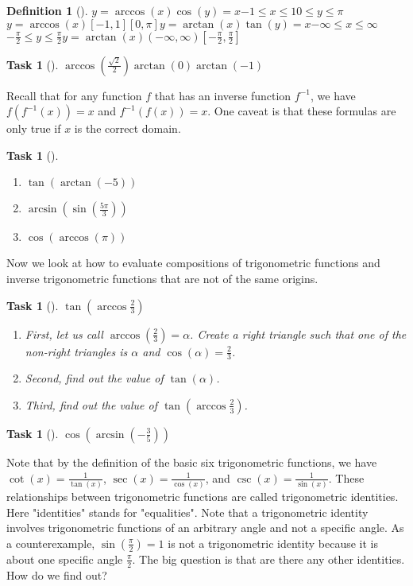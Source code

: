 \documentclass[10pt,]{article}
\theoremstyle{plain}
\newtheorem{proposition}[theorem]{Task}
\theoremstyle{definition}
\newtheorem{definition}[theorem]{Definition}
\numberwithin{equation}{section}
\begin{document}
\begin{definition}[{}]\label{definition-6}
\(y=\arccos(x)\)\(\cos(y)=x\)\(-1 \leq x \leq 1\)\(0 \leq y \leq \pi\)\(y=\arccos(x)\)\([-1,1]\)\([0,\pi]\)\(y=\arctan(x)\)\(\tan(y)=x\)\(-\infty \leq x \leq \infty\)\(-\frac{\pi}{2} \leq y \leq \frac{\pi}{2}\)\(y=\arctan(x)\)\((-\infty,\infty)\)\([-\frac{\pi}{2},\frac{\pi}{2}]\)\end{definition}
\begin{proposition}[{}]\label{proposition-68}
\(\arccos(\frac{\sqrt{2}}{2})\)\(\arctan(0)\)\(\arctan(-1)\)\end{proposition}
\hypertarget{p-132}{}%
Recall that for any function \(f\) that has an inverse function \(f^{-1}\), we have \(f(f^{-1}(x))=x\) and \(f^{-1}(f(x))=x\). One caveat is that these formulas are only true if \(x\) is the correct domain.%
\begin{proposition}[{}]\label{proposition-69}
\leavevmode%
\begin{enumerate}
\item\hypertarget{li-281}{}\(\tan(\arctan(-5))\)%
\item\hypertarget{li-282}{}\(\arcsin(\sin(\frac{5\pi}{3}))\)%
\item\hypertarget{li-283}{}\(\cos(\arccos(\pi))\)%
\end{enumerate}
\end{proposition}
\hypertarget{p-133}{}%
Now we look at how to evaluate compositions of trigonometric functions and inverse trigonometric functions that are not of the same origins.%
\begin{proposition}[{}]\label{proposition-70}
\(\tan(\arccos\frac{2}{3})\)\leavevmode%
\begin{enumerate}
\item\hypertarget{li-284}{}First, let us call \(\arccos(\frac{2}{3})=\alpha\). Create a right triangle such that one of the non-right triangles is \(\alpha\) and \(\cos(\alpha)=\frac{2}{3}\).%
\item\hypertarget{li-285}{}Second, find out the value of \(\tan(\alpha)\).%
\item\hypertarget{li-286}{}Third, find out the value of \(\tan(\arccos\frac{2}{3})\).%
\end{enumerate}
\end{proposition}
\begin{proposition}[{}]\label{proposition-71}
\(\cos(\arcsin(-\frac{3}{5}))\)\end{proposition}
\hypertarget{p-134}{}%
Note that by the definition of the basic six trigonometric functions, we have \(\cot(x) = \frac{1}{\tan(x)}\), \(\sec(x) = \frac{1}{\cos(x)}\), and \(\csc(x) = \frac{1}{\sin(x)}\). These relationships between trigonometric functions are called trigonometric identities. Here "identities" stands for "equalities". Note that a trigonometric identity involves trigonometric functions of an arbitrary angle and not a specific angle. As a counterexample, \(\sin(\frac{\pi}{2}) = 1\) is not a trigonometric identity because it is about one specific angle \(\frac{\pi}{2}\). The big question is that are there any other identities. How do we find out?%
\end{document}
